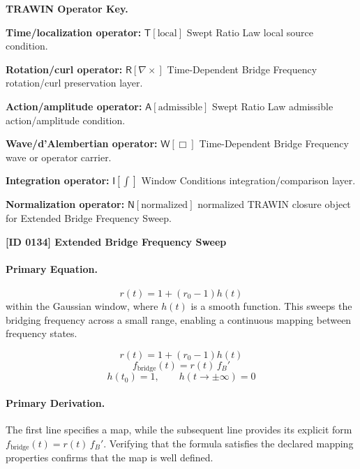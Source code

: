 \par\vspace{0.45\baselineskip}
\noindent\begin{minipage}[t]{\linewidth}
\begingroup
\small
\raggedright
\textbf{TRAWIN Operator Key.}\par
\noindent\textbf{Time/localization operator:} $\mathsf{T}\!\left[\mathrm{local}\right]$ Swept Ratio Law local source condition.\par
\noindent\textbf{Rotation/curl operator:} $\mathsf{R}\!\left[\nabla\times\right]$ Time-Dependent Bridge Frequency rotation/curl preservation layer.\par
\noindent\textbf{Action/amplitude operator:} $\mathsf{A}\!\left[\mathrm{admissible}\right]$ Swept Ratio Law admissible action/amplitude condition.\par
\noindent\textbf{Wave/d'Alembertian operator:} $\mathsf{W}\!\left[\Box\right]$ Time-Dependent Bridge Frequency wave or operator carrier.\par
\noindent\textbf{Integration operator:} $\mathsf{I}\!\left[\int\right]$ Window Conditions integration/comparison layer.\par
\noindent\textbf{Normalization operator:} $\mathsf{N}\!\left[\mathrm{normalized}\right]$ normalized TRAWIN closure object for Extended Bridge Frequency Sweep.\par
\endgroup
\end{minipage}

\clearpage
\noindent\textbf{[ID 0134] Extended Bridge Frequency Sweep}\par
\vspace{0.35em}
\paragraph{Primary Equation.}
\[ r(t) = 1 + (r_0 - 1) h(t) \] within the Gaussian window, where $h(t)$ is a smooth function. This sweeps the bridging frequency across a small range, enabling a continuous mapping between frequency states.

\[
r(t)=1+(r_0-1)h(t)
\]
\[
f_{\mathrm{bridge}}(t)=r(t)\,f_B'
\]
\[
h(t_0)=1,\qquad h(t\to\pm\infty)=0
\]

\paragraph{Primary Derivation.}
The first line specifies a map, while the subsequent line provides its explicit form \( f_{\mathrm{bridge}}(t)=r(t)\,f_B' \). Verifying that the formula satisfies the declared mapping properties confirms that the map is well defined.
